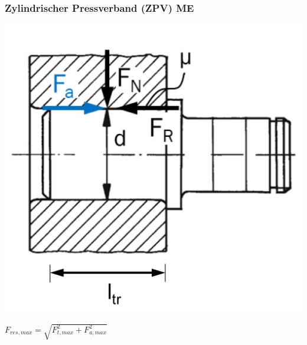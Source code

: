 \subsubsection{Zylindrischer Pressverband (ZPV) \hfill ME}
\begin{footnotesize}
    \begin{minipage}{0.3\linewidth}
        \begin{center}
            \includegraphics[width = 1.0\linewidth]{src/images/MAEIP_Zylindrischer_Pressverband}
        \end{center}
    \end{minipage}
    \begin{minipage}{0.58\linewidth}
        \begin{center}
            \scriptsize{$F_{res,max} = \sqrt{F_{t,max}^2 + F_{a,max}^2}$} 
        \end{center}
    \end{minipage}
\end{footnotesize}